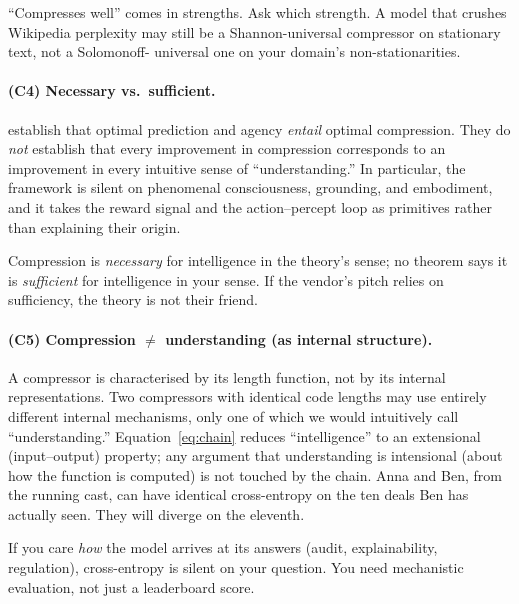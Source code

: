 \documentclass[12pt,a4paper]{article}
\theoremstyle{plain}
\theoremstyle{definition}
\begin{document}
\begin{procurement}
``Compresses well'' comes in strengths. Ask which strength. A
model that crushes Wikipedia perplexity may still be a
Shannon-universal compressor on stationary text, not a Solomonoff-
universal one on your domain's non-stationarities.
\end{procurement}

\paragraph{(C4) Necessary vs.\ sufficient.}
 establish that optimal prediction
and agency \emph{entail} optimal compression. They do \emph{not}
establish that every improvement in compression corresponds to an
improvement in every intuitive sense of ``understanding.'' In
particular, the framework is silent on phenomenal consciousness,
grounding, and embodiment, and it takes the reward signal and the
action--percept loop as primitives rather than explaining their
origin.

\begin{procurement}
Compression is \emph{necessary} for intelligence in the theory's
sense; no theorem says it is \emph{sufficient} for intelligence in
your sense. If the vendor's pitch relies on sufficiency, the
theory is not their friend.
\end{procurement}

\paragraph{(C5) Compression $\ne$ understanding (as internal structure).}
A compressor is characterised by its length function, not by its
internal representations. Two compressors with identical code
lengths may use entirely different internal mechanisms, only one of
which we would intuitively call ``understanding.''
Equation~\eqref{eq:chain} reduces ``intelligence'' to an extensional
(input--output) property; any argument that understanding is
intensional (about how the function is computed) is not touched by
the chain. Anna and Ben, from the running cast, can have identical
cross-entropy on the ten deals Ben has actually seen. They will
diverge on the eleventh.

\begin{procurement}
If you care \emph{how} the model arrives at its answers (audit,
explainability, regulation), cross-entropy is silent on your
question. You need mechanistic evaluation, not just a leaderboard
score.
\end{procurement}
\end{document}
